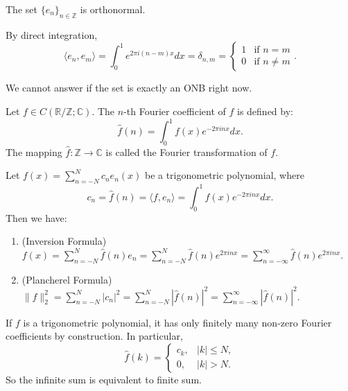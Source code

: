 \documentclass[12pt]{article}
\begin{document}
\begin{theorem}
    The set $\{e_{n}\}_{n\in\mathbb{Z}}$ is orthonormal.
\end{theorem}

\begin{pfbox}
    By direct integration,
    $$ \langle e_{n},e_{m}\rangle=\int_{0}^{1}e^{2\pi i(n-m)x}dx = \delta_{n,m} = \begin{cases} 1 & \text{if } n=m \\ 0 & \text{if } n\ne m \end{cases}.$$
\end{pfbox}

\begin{remark}
    We cannot answer if the set is exactly an ONB right now.
\end{remark}




\begin{definition}
Let $f\in  C(\mathbb{R}/\mathbb{Z}; \mathbb{C})$.
The $n$-th Fourier coefficient of $f$ is defined by:
\[
\hat{f}(n) = \int_{0}^{1}f(x)e^{-2\pi inx}dx.
\] 
The mapping $\hat{f}:\mathbb{Z}\rightarrow\mathbb{C}$ is called the Fourier transformation of $f$.
\end{definition}


\begin{theorem}
    Let $f(x)=\sum_{n=-N}^{N}c_n e_n(x)$ be a trigonometric polynomial, 
    where 
    \[c_n=\hat{f}(n) = \langle f,e_n\rangle = \int_{0}^{1}f(x)e^{-2\pi inx} dx.\]
    Then we have:
    \begin{enumerate}
        \item (Inversion Formula) $f(x)=\sum_{n=-N}^{N}\hat{f}(n)e_n = \sum_{n=-N}^{N}\hat{f}(n)e^{2\pi inx} = \sum_{n=-\infty}^{\infty}\hat{f}(n)e^{2\pi inx}$.
        \item (Plancherel Formula) $\|f\|^2_2 = \sum_{n=-N}^{N}|c_n|^2 = \sum_{n=-N}^{N}|\hat{f}(n)|^2 = \sum_{n=-\infty}^{\infty}|\hat{f}(n)|^2.$
    \end{enumerate}
\end{theorem}

\begin{remark}
    If $f$ is a trigonometric polynomial, it has only finitely many non-zero Fourier coefficients by construction. In particular,
    \[\hat f(k) =
    \begin{cases}
        c_k, & |k| \le N, \\
        0, & |k| > N.
\end{cases}\]
So the infinite sum is equivalent to finite sum.
\end{remark}
\end{document}

